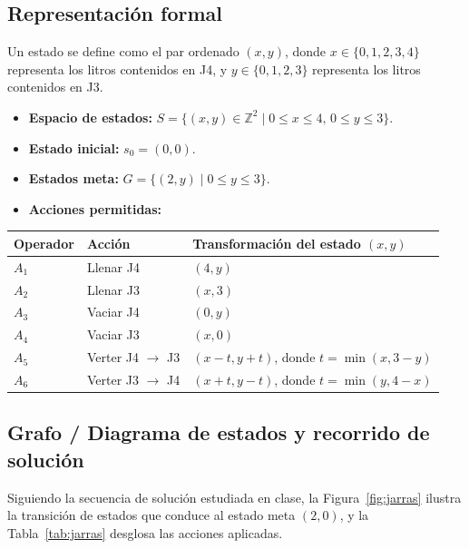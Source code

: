 \documentclass[11pt,letterpaper]{article}
\begin{document}
\subsection{Representación formal}
Un estado se define como el par ordenado $(x, y)$, donde $x \in \{0,1,2,3,4\}$ representa los litros contenidos en J4, y $y \in \{0,1,2,3\}$ representa los litros contenidos en J3.

\begin{itemize}
  \item \textbf{Espacio de estados:} $S = \{(x,y) \in \mathbb{Z}^2 \mid 0 \le x \le 4, \, 0 \le y \le 3\}$.
  \item \textbf{Estado inicial:} $s_0 = (0,0)$.
  \item \textbf{Estados meta:} $G = \{(2,y) \mid 0 \le y \le 3\}$.
  \item \textbf{Acciones permitidas:}
\end{itemize}

\begin{center}
\small
\renewcommand{\arraystretch}{1.2}
\begin{tabular}{@{}lll@{}}
\toprule
\textbf{Operador} & \textbf{Acción} & \textbf{Transformación del estado $(x,y)$} \\
\midrule
$A_1$ & Llenar J4 & $(4, y)$ \\
$A_2$ & Llenar J3 & $(x, 3)$ \\
$A_3$ & Vaciar J4 & $(0, y)$ \\
$A_4$ & Vaciar J3 & $(x, 0)$ \\
$A_5$ & Verter J4 $\to$ J3 & $(x - t, y + t)$, donde $t = \min(x, 3-y)$ \\
$A_6$ & Verter J3 $\to$ J4 & $(x + t, y - t)$, donde $t = \min(y, 4-x)$ \\
\bottomrule
\end{tabular}
\end{center}

\subsection{Grafo / Diagrama de estados y recorrido de solución}

Siguiendo la secuencia de solución estudiada en clase, la Figura~\ref{fig:jarras} ilustra la transición de estados que conduce al estado meta $(2,0)$, y la Tabla~\ref{tab:jarras} desglosa las acciones aplicadas.
\end{document}
